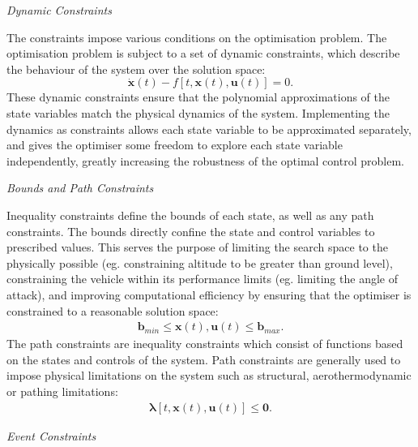 \noindent \textit{Dynamic Constraints}

\noindent The constraints impose various conditions on the optimisation problem.
The optimisation problem is subject to a set of dynamic constraints, which describe the behaviour of the system over the solution space:
\begin{equation} \label{eq:state}
\dot{\textbf{x}}(t) - f[t,\textbf{x}(t),\textbf{u}(t)] = 0.
\end{equation}
These dynamic constraints ensure that the polynomial approximations of the state variables match the physical dynamics of the system. Implementing the dynamics as constraints allows each state variable to be approximated separately, and gives the optimiser some freedom to explore each state variable independently, greatly increasing the robustness of the optimal control problem.



\noindent \textit{Bounds and Path Constraints}

\noindent Inequality constraints define the bounds of each state, as well as any path constraints.
The bounds directly confine the state and control variables to prescribed values. This serves the purpose of limiting the search space to the physically possible (eg. constraining altitude to be greater than ground level), constraining the vehicle within its performance limits (eg. limiting the angle of attack), and improving computational efficiency by ensuring that the optimiser is constrained to a reasonable solution space:
\begin{eqnarray}
\mathbf{b}_{min} \leq \textbf{x}(t),\textbf{u}(t) \leq \mathbf{b}_{max}.
\end{eqnarray}
The path constraints are inequality constraints which consist of functions based on the states and controls of the system. Path constraints are generally used to impose physical limitations on the system such as structural, aerothermodynamic or pathing limitations:
\begin{eqnarray}
\mathbf{\lambda}[t,\textbf{x}(t),\textbf{u}(t)] \leq \textbf{0}.
\end{eqnarray}

\noindent \textit{Event Constraints}

